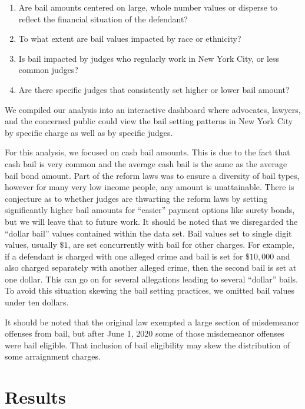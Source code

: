 \documentclass[
  english,
  man]{apa6}
\providecommand{\tightlist}{%
  \setlength{\itemsep}{0pt}\setlength{\parskip}{0pt}}
\begin{document}
\begin{enumerate}
\def\labelenumi{\arabic{enumi}.}
\tightlist
\item
  Are bail amounts centered on large, whole number values or disperse to reflect the financial situation of the defendant?
\item
  To what extent are bail values impacted by race or ethnicity?
\item
  Is bail impacted by judges who regularly work in New York City, or less common judges?
\item
  Are there specific judges that consistently set higher or lower bail amount?
\end{enumerate}

We compiled our analysis into an interactive dashboard where advocates, lawyers, and the concerned public could view the bail setting patterns in New York City by specific charge as well as by specific judges.

For this analysis, we focused on cash bail amounts. This is due to the fact that cash bail is very common and the average cash bail is the same as the average bail bond amount. Part of the reform laws was to ensure a diversity of bail types, however for many very low income people, any amount is unattainable. There is conjecture as to whether judges are thwarting the reform laws by setting significantly higher bail amounts for \enquote{easier} payment options like surety bonds, but we will leave that to future work. It should be noted that we disregarded the \enquote{dollar bail} values contained within the data set. Bail values set to single digit values, usually \(\$1\), are set concurrently with bail for other charges. For example, if a defendant is charged with one alleged crime and bail is set for \(\$10,000\) and also charged separately with another alleged crime, then the second bail is set at one dollar. This can go on for several allegations leading to several \enquote{dollar} bails. To avoid this situation skewing the bail setting practices, we omitted bail values under ten dollars.

It should be noted that the original law exempted a large section of misdemeanor offenses from bail, but after June 1, 2020 some of those misdemeanor offenses were bail eligible. That inclusion of bail eligibility may skew the distribution of some arraignment charges.

\hypertarget{results}{%
\section{Results}\label{results}}
\end{document}
